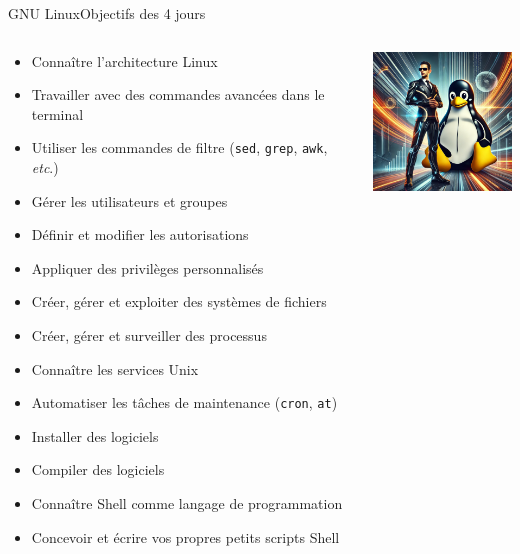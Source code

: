 \documentclass{beamer}
\begin{document}
    \begin{frame}{GNU Linux}{Objectifs des 4 jours}
        \begin{columns}
            \begin{scriptsize}
                \begin{itemize}
                    \item Connaître l'architecture Linux
                    \item Travailler avec des commandes avancées dans le terminal
                    \item Utiliser les commandes de filtre (\lstinline{sed}, \lstinline{grep}, \lstinline{awk}, \textit{etc}.)
                    \item Gérer les utilisateurs et groupes
                    \item Définir et modifier les autorisations
                    \item Appliquer des privilèges personnalisés
                    \item Créer, gérer et exploiter des systèmes de fichiers
                    \item Créer, gérer et surveiller des processus
                    \item Connaître les services Unix
                    \item Automatiser les tâches de maintenance (\lstinline{cron}, \lstinline{at})
                    \item Installer des logiciels
                    \item Compiler des logiciels
                    \item Connaître Shell comme langage de programmation
                    \item Concevoir et écrire vos propres petits scripts Shell
                \end{itemize}
            \end{scriptsize}
            \includegraphics[width=4cm]{image/IT-man-and-penguin}
        \end{columns}
    \end{frame}
\end{document}
